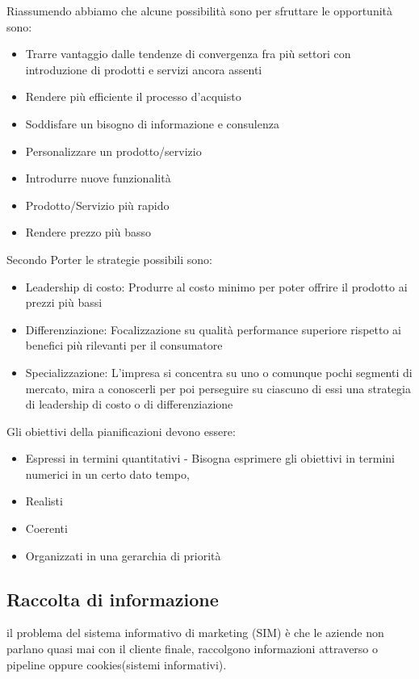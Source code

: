 \documentclass[11pt]{article}
\newenvironment{nosepitemize}{\begin{itemize}[noitemsep,topsep=0ex]}{\end{itemize}}
\begin{document}
Riassumendo abbiamo che alcune possibilità sono per sfruttare le opportunità sono:
\begin{nosepitemize}
	\item Trarre vantaggio dalle tendenze di convergenza fra più settori con introduzione di prodotti e servizi ancora assenti
	\item Rendere più efficiente il processo d'acquisto
	\item Soddisfare un bisogno di informazione e consulenza
	\item Personalizzare un prodotto/servizio
	\item Introdurre nuove funzionalità
	\item Prodotto/Servizio più rapido
	\item Rendere prezzo più basso
\end{nosepitemize}

Secondo Porter le strategie possibili sono:
\begin{itemize}[topsep=0ex]
	\item Leadership di costo: Produrre al costo minimo per poter offrire il prodotto ai prezzi più bassi
	\item Differenziazione: Focalizzazione su qualità performance superiore rispetto ai benefici più rilevanti per il consumatore
	\item Specializzazione: L'impresa si concentra su uno o comunque pochi segmenti di mercato, mira a conoscerli per poi perseguire su ciascuno di essi una strategia di leadership di costo o di differenziazione
\end{itemize}
Gli obiettivi della pianificazioni devono essere:
\begin{itemize}[noitemsep,topsep=0ex]
	\item Espressi in termini quantitativi - Bisogna esprimere gli obiettivi in termini numerici in un certo dato tempo,
	\item Realisti
	\item Coerenti
	\item Organizzati in una gerarchia di priorità
\end{itemize}

\subsection{Raccolta di informazione}
il problema del sistema informativo di marketing (SIM) è che le aziende non parlano quasi mai con il cliente finale, raccolgono informazioni attraverso o pipeline oppure cookies(sistemi informativi).
\end{document}
